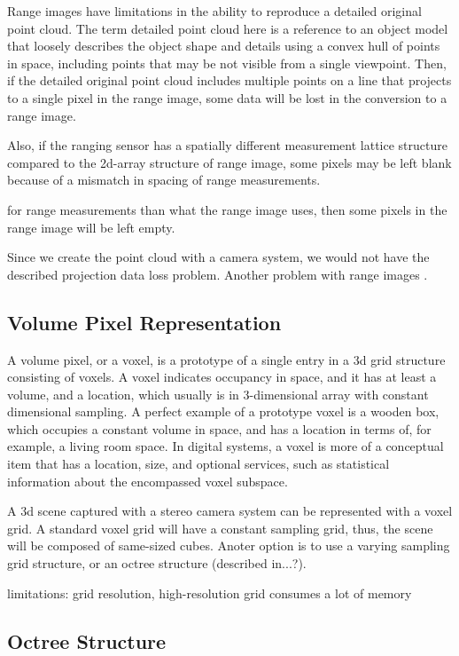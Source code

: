 \documentclass[12pt,a4paper,oneside,pdftex]{report}
\begin{document}
Range images have limitations in the ability to reproduce a detailed original point cloud. The term detailed point cloud here is a reference to an object model that loosely describes the object shape and details using a convex hull of points in space, including points that may be not visible from a single viewpoint. Then, if the detailed original point cloud includes multiple points on a line that projects to a single pixel in the range image, some data will be lost in the conversion to a range image. 

Also, if the ranging sensor has a spatially different measurement lattice structure compared to the 2d-array structure of range image, some pixels may be left blank because of a mismatch in spacing of range measurements.

for range measurements than what the range image uses, then some pixels in the range image will be left empty.

Since we create the point cloud with a camera system, we would not have the described projection data loss problem. Another problem with range images       \cite{Unnikrishnan08}.

\subsection{Volume Pixel Representation}
\label{subsection:volume_pixel_representation}

A volume pixel, or a voxel, is a prototype of a single entry in a 3d grid structure consisting of voxels. A voxel indicates occupancy in space, and it has at least a volume, and a location, which usually is in 3-dimensional array with constant dimensional sampling. A perfect example of a prototype voxel is a wooden box, which occupies a constant volume in space, and has a location in terms of, for example, a living room space. In digital systems, a voxel is more of a conceptual item that has a location, size, and optional services, such as statistical information about the encompassed voxel subspace. 

A 3d scene captured with a stereo camera system can be represented with a voxel grid. A standard voxel grid will have a constant sampling grid, thus, the scene will be composed of same-sized cubes. Anoter option is to use a varying sampling grid structure, or an octree structure (described in...?).

limitations: grid resolution, high-resolution grid consumes a lot of memory

\subsection{Octree Structure}
\label{subsection:octree_structure}
\end{document}
